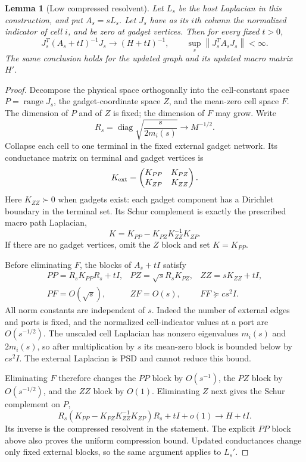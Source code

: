 \documentclass[11pt]{article}
\newtheorem{lemma}[theorem]{Lemma}
\newcommand{\norm}[1]{\left\lVert#1\right\rVert}
\newcommand{\diag}{\operatorname{diag}}
\begin{document}
\begin{lemma}[Low compressed resolvent]\label{lem:resolvent}
Let $L_s$ be the host Laplacian in this construction, and put
$A_s=sL_s$. Let $J_s$ have as its $i$th column the normalized indicator
of cell $i$, and be zero at gadget vertices. Then for every fixed $t>0$,
\[
 J_s^T(A_s+tI)^{-1}J_s\longrightarrow(H+tI)^{-1},
 \qquad \sup_s\norm{J_s^TA_sJ_s}<\infty.
\]
The same conclusion holds for the updated graph and its updated
macro matrix $H'$.
\end{lemma}
\begin{proof}
Decompose the physical space orthogonally into the cell-constant
space $P=\operatorname{range}J_s$, the gadget-coordinate space $Z$,
and the mean-zero cell space $F$. The dimension of $P$ and of $Z$
is fixed; the dimension of $F$ may grow. Write
\[
 R_s=\diag\sqrt{\frac{s}{2m_i(s)}}\longrightarrow M^{-1/2}.
\]
Collapse each cell to one terminal in the fixed external gadget
network. Its conductance matrix on terminal and gadget vertices is
\[
 K_{\rm ext}=\begin{pmatrix}K_{PP}&K_{PZ}\\K_{ZP}&K_{ZZ}\end{pmatrix}.
\]
Here $K_{ZZ}\succ0$ when gadgets exist: each gadget component has a
Dirichlet boundary in the terminal set. Its Schur complement is exactly
the prescribed macro path Laplacian,
\[
 K=K_{PP}-K_{PZ}K_{ZZ}^{-1}K_{ZP}.
\]
If there are no gadget vertices, omit the $Z$ block and set $K=K_{PP}$.

Before eliminating $F$, the blocks of $A_s+tI$ satisfy
\[
 \begin{array}{lll}
 PP=R_sK_{PP}R_s+tI,&
 PZ=\sqrt{s}R_sK_{PZ},& ZZ=sK_{ZZ}+tI,\\
 PF=O(\sqrt{s}),& ZF=O(s),& FF\succeq c s^2 I.
 \end{array}
\]
All norm constants are independent of $s$. Indeed the number of
external edges and ports is fixed, and the normalized cell-indicator
values at a port are $O(s^{-1/2})$. The unscaled cell Laplacian has
nonzero eigenvalues $m_i(s)$ and $2m_i(s)$, so after multiplication
by $s$ its mean-zero block is bounded below by $c s^2I$.
The external Laplacian is PSD and cannot reduce this bound.

Eliminating $F$ therefore changes the $PP$ block by $O(s^{-1})$,
the $PZ$ block by $O(s^{-1/2})$, and the $ZZ$ block by $O(1)$.
Eliminating $Z$ next gives the Schur complement on $P$,
\[
 R_s(K_{PP}-K_{PZ}K_{ZZ}^{-1}K_{ZP})R_s+tI+o(1)
       \longrightarrow H+tI.
\]
Its inverse is the compressed resolvent in the statement.
The explicit $PP$ block above also proves the uniform compression
bound. Updated conductances change only fixed external blocks, so
the same argument applies to $L_s'$.
\end{proof}
\end{document}
